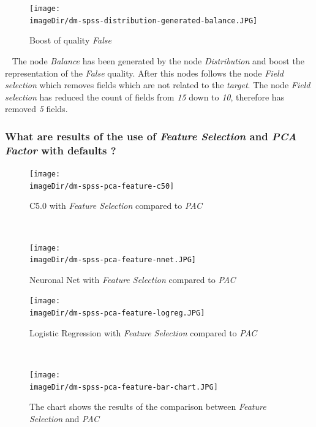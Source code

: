 \documentclass[11pt, a4paper, twoside]{article}   	%
\newcommand{\imageDir}{./images/}
\begin{document}
\begin{figure}[h]
\centering
\texttt{[image: \\imageDir/dm-spss-distribution-generated-balance.JPG]}
\caption{Boost of quality \emph{False}}
\end{figure}
\ \newline
The node \emph{Balance} has been generated by the node \emph{Distribution} and boost the representation of the \emph{False} quality. After this nodes follows the node \emph{Field selection} which removes fields which are not related to the \emph{target}. 
\newline
\newline
The node \emph{Field selection} has reduced the count of fields from \emph{15} down to \emph{10}, therefore has removed \emph{5} fields.
\newline
\newline

\subsubsection{What are results of the use of \emph{Feature Selection} and \emph{PCA Factor} with defaults ? }
\begin{figure}[h]
\centering
\texttt{[image: \\imageDir/dm-spss-pca-feature-c50]}
\caption{C5.0 with \emph{Feature Selection} compared to \emph{PAC}}
\end{figure}
\ \newpage

\begin{figure}[h]
\centering
\texttt{[image: \\imageDir/dm-spss-pca-feature-nnet.JPG]}
\caption{Neuronal Net with \emph{Feature Selection} compared to \emph{PAC}}
\end{figure}

\begin{figure}[h]
\centering
\texttt{[image: \\imageDir/dm-spss-pca-feature-logreg.JPG]}
\caption{Logistic Regression with \emph{Feature Selection} compared to \emph{PAC}}
\end{figure}
\ \newpage

\begin{figure}[h]
\centering
\texttt{[image: \\imageDir/dm-spss-pca-feature-bar-chart.JPG]}
\caption{The chart shows the results of the comparison between \emph{Feature Selection} and \emph{PAC} }
\end{figure}
\end{document}
